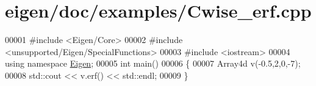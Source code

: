 \hypertarget{eigen_2doc_2examples_2_cwise__erf_8cpp_source}{}\section{eigen/doc/examples/\+Cwise\+\_\+erf.cpp}
\label{eigen_2doc_2examples_2_cwise__erf_8cpp_source}

\begin{DoxyCode}
00001 \textcolor{preprocessor}{#include <Eigen/Core>}
00002 \textcolor{preprocessor}{#include <unsupported/Eigen/SpecialFunctions>}
00003 \textcolor{preprocessor}{#include <iostream>}
00004 \textcolor{keyword}{using namespace }\hyperlink{namespace_eigen}{Eigen};
00005 \textcolor{keywordtype}{int} main()
00006 \{
00007   Array4d v(-0.5,2,0,-7);
00008   std::cout << v.erf() << std::endl;
00009 \}
\end{DoxyCode}
